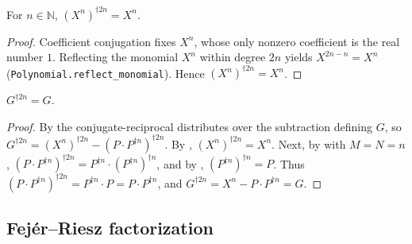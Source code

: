 \begin{lemma}
    \label{lem:conjrecip-X-pow}
    \leanok
    For $n \in \mathbb{N}$, $(X^{n})^{\dagger 2n} = X^{n}$.
\end{lemma}
\begin{proof}
    Coefficient conjugation fixes $X^{n}$, whose only nonzero coefficient is the
    real number $1$. Reflecting the monomial $X^{n}$ within degree $2n$ yields
    $X^{2n - n} = X^{n}$ (\texttt{Polynomial.reflect\_monomial}). Hence
    $(X^{n})^{\dagger 2n} = X^{n}$.
\end{proof}

\begin{lemma}
    \label{lem:G-self-inversive}
    \leanok
    $G^{\dagger 2n} = G$.
\end{lemma}
\begin{proof}
    By  the conjugate-reciprocal distributes over the
    subtraction defining $G$, so
    $G^{\dagger 2n} = (X^{n})^{\dagger 2n} - (P\cdot P^{\dagger n})^{\dagger 2n}$.
    By , $(X^{n})^{\dagger 2n} = X^{n}$. Next, by
     with $M = N = n$,
    $(P\cdot P^{\dagger n})^{\dagger 2n} = P^{\dagger n}\cdot (P^{\dagger n})^{\dagger n}$,
    and by , $(P^{\dagger n})^{\dagger n} = P$.
    Thus $(P\cdot P^{\dagger n})^{\dagger 2n} = P^{\dagger n}\cdot P = P\cdot P^{\dagger n}$,
    and $G^{\dagger 2n} = X^{n} - P\cdot P^{\dagger n} = G$.
\end{proof}

\subsection{Fejér--Riesz factorization}

